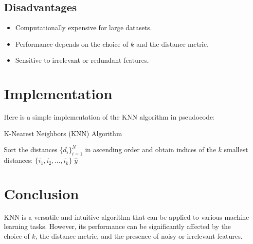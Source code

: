 \documentclass[12pt]{article}
\begin{document}
\subsection{Disadvantages}
\begin{itemize}
    \item Computationally expensive for large datasets.
    \item Performance depends on the choice of \( k \) and the distance metric.
    \item Sensitive to irrelevant or redundant features.
\end{itemize}
\section{Implementation}
Here is a simple implementation of the KNN algorithm in pseudocode:

\begin{algorithm}
    \caption{K-Nearest Neighbors (KNN) Algorithm}\label{alg:knn}
    
    Sort the distances $\{d_i\}_{i=1}^N$ in ascending order and obtain indices of the $k$ smallest distances: $\{i_1, i_2, \ldots, i_k\}$\;
    \Return $\hat{y}$\;
    
\end{algorithm}

\section{Conclusion}
KNN is a versatile and intuitive algorithm that can be applied to various machine learning tasks. However, its performance can be significantly affected by the choice of \( k \), the distance metric, and the presence of noisy or irrelevant features.
\end{document}
